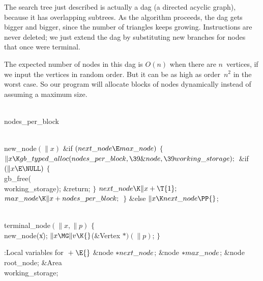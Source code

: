 The search tree just described is actually a dag (a directed acyclic
graph), because it has overlapping subtrees. As the algorithm proceeds,
the dag gets bigger and bigger, since the number of triangles keeps
growing. Instructions are never deleted; we just extend the dag by
substituting new branches for nodes that once were terminal.

The expected number of nodes in this dag is $O(n)$ when there are $n$~vertices,
if we input the vertices in random order. But it can be as high as order~$n^2$
in the worst case. So our program will allocate blocks of nodes dynamically
instead of assuming a maximum size.

\Y\B\4\D\\{nodes\_per\_block}\5
\par
\B\4\D\\{new\_node}$(\|x)$\6
\&{if} ${}(\\{next\_node}\E\\{max\_node}){}$\5
${}\{{}$\1\6
${}\|x\K\\{gb\_typed\_alloc}(\\{nodes\_per\_block},\39\&{node},\39\\{working%
\_storage});{}$\6
\&{if} ${}(\|x\E\NULL){}$\5
${}\{{}$\1\6
\\{gb\_free}(\\{working\_storage});\6
\&{return};\6
\4${}\}{}$\2\6
${}\\{next\_node}\K\|x+\T{1};{}$\6
${}\\{max\_node}\K\|x+\\{nodes\_per\_block};{}$\6
\4${}\}{}$\5
\2\&{else}\1\5
${}\|x\K\\{next\_node}\PP{}$;\2\Y\par
\B\4\D\\{terminal\_node}$(\|x,\|p)$\6
${}\{{}$\5
\1\\{new\_node}(\|x);\6
${}\|x\MG\|v\K{}$(\&{Vertex} ${}{*})(\|p){}$;\6
\4${}\}{}$%
\2\par
\Y\B\4:Local variables for \X${}\mathrel+\E{}$\6
\&{node} ${}{*}\\{next\_node}{}$;\6
\&{node} ${}{*}\\{max\_node}{}$;\6
\&{node} \\{root\_node};\6
\&{Area} \\{working\_storage};\par
\fi

